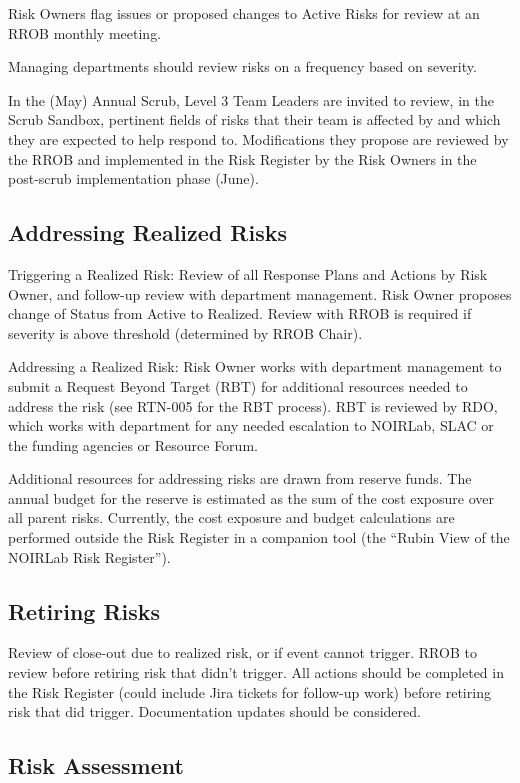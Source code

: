 Risk Owners flag issues or proposed changes to Active Risks for review at an RROB monthly meeting.

Managing departments should review risks on a frequency based on severity.

In the (May) Annual Scrub, Level 3 Team Leaders are invited to review, in the Scrub Sandbox, pertinent fields of risks that their team is affected by and which they are expected to help respond to.
Modifications they propose are reviewed by the RROB and implemented in the Risk Register by the Risk Owners in the post-scrub implementation phase (June).

\subsection{Addressing Realized Risks}

Triggering a Realized Risk:
Review of all Response Plans and Actions by Risk Owner, and follow-up review with department management.
Risk Owner proposes change of Status from Active to Realized.
Review with RROB is required if severity is above threshold (determined by RROB Chair).

Addressing a Realized Risk:
Risk Owner works with department management to submit a Request Beyond Target (RBT) for additional resources needed to address the risk (see RTN-005 for the RBT process).
RBT is reviewed by RDO, which works with department for any needed escalation to NOIRLab, SLAC or the funding agencies or Resource Forum.

Additional resources for addressing risks are drawn from reserve funds.
The annual budget for the reserve is estimated as the sum of the cost exposure over all parent risks.
Currently, the cost exposure and budget calculations are performed outside the Risk Register in a companion tool (the ``Rubin View of the NOIRLab Risk Register'').

\subsection{Retiring Risks}

Review of close-out due to realized risk, or if event cannot trigger.
RROB to review before retiring risk that didn't trigger.
All actions should be completed in the Risk Register (could include Jira tickets for follow-up work) before retiring risk that did trigger.
Documentation updates should be considered.

\subsection{Risk Assessment}

